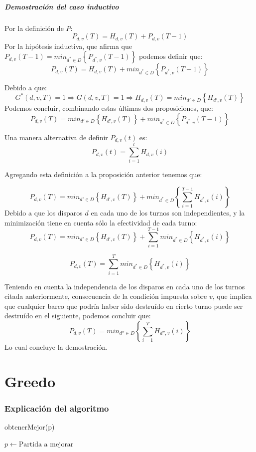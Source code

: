 \documentclass{article}
\begin{document}
\subsubsection{Demostración del caso inductivo}
Por la definición de $P$: $$P_{d,v}(T)=H_{d,v}(T)+P_{d,v}(T-1)$$
Por la hipótesis inductiva, que afirma que $P_{d,v}(T-1)=min_{d^* \in D}\left \{ P_{d^*,v}(T-1) \right \}$ podemos definir que:
$$P_{d,v}(T)=H_{d,v}(T)+min_{d^* \in D}\left \{ P_{d^*,v}(T-1) \right \}$$

Debido a que: $$G^*(d,v,T)=1 \Rightarrow G(d,v,T)=1 \Rightarrow H_{d,v}(T)=min_{d' \in D} \left \{ H_{d',v}(T) \right \}$$
Podemos concluir, combinando estas últimas dos proposiciones, que:
$$P_{d,v}(T)=min_{d' \in D} \left \{ H_{d',v}(T) \right \}+min_{d^* \in D}\left \{ P_{d^*,v}(T-1) \right \}$$

Una manera alternativa de definir $P_{d,v}(t)$ es:$$P_{d,v}(t)=\sum_{i=1}^{t} H_{d,v}(i)$$

Agregando esta definición a la proposición anterior tenemos que:

$$P_{d,v}(T)=min_{d' \in D} \left \{ H_{d',v}(T) \right \}+min_{d^* \in D}\left \{ \sum_{i=1}^{T-1} H_{d^*,v}(i) \right \}$$
Debido a que los disparos $d$ en cada uno de los turnos son independientes, y la minimización tiene en cuenta sólo la efectividad de cada turno:
$$P_{d,v}(T)=min_{d' \in D} \left \{ H_{d',v}(T) \right \}+\sum_{i=1}^{T-1} min_{d^* \in D}\left \{  H_{d^*,v}(i) \right \}$$

$$P_{d,v}(T)=\sum_{i=1}^{T} min_{d^* \in D}\left \{  H_{d^*,v}(i) \right \}$$

Teniendo en cuenta la independencia de los disparos en cada uno de los turnos citada anteriormente, consecuencia de la condición impuesta sobre $v$, que implica que cualquier barco que podría haber sido destruído en cierto turno puede ser destruído en el siguiente, podemos concluir que:
$$P_{d,v}(T)=min_{d'' \in D}\left \{ \sum_{i=1}^{T} H_{d'',v}(i) \right \}$$
Lo cual concluye la demostración.

\part{Greedo}

\section{Explicación del algoritmo}

\begin{algorithm}
\caption{obtenerMejor(p)}
    $p \leftarrow \text{Partida a mejorar}$ \\
\end{algorithm}
\end{document}
